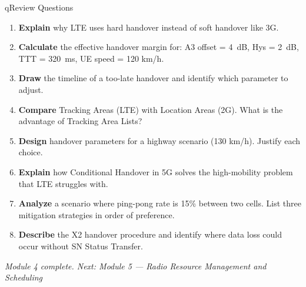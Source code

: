 \begin{CNbox}[unbreakable]{q}{Review Questions}

\begin{enumerate}
\def\labelenumi{\arabic{enumi}.}
\tightlist
\item
  \textbf{Explain} why LTE uses hard handover instead of soft handover like 3G.
\item
  \textbf{Calculate} the effective handover margin for: A3 offset = 4~dB, Hys = 2~dB, TTT = 320~ms, UE speed = 120 km/\allowbreak{}h.
\item
  \textbf{Draw} the timeline of a too-late handover and identify which parameter to adjust.
\item
  \textbf{Compare} Tracking Areas (LTE) with Location Areas (2G). What is the advantage of Tracking Area Lists?
\item
  \textbf{Design} handover parameters for a highway scenario (130 km/\allowbreak{}h). Justify each choice.
\item
  \textbf{Explain} how Conditional Handover in 5G solves the high-mobility problem that LTE struggles with.
\item
  \textbf{Analyze} a scenario where ping-pong rate is 15\% between two cells. List three mitigation strategies in order of preference.
\item
  \textbf{Describe} the X2 handover procedure and identify where data loss could occur without SN Status Transfer.
\end{enumerate}

\emph{Module 4 complete. Next: Module 5 — Radio Resource Management and Scheduling}

\end{CNbox}
